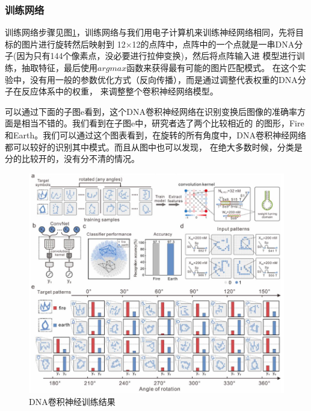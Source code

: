 \documentclass[a4paper,twoside]{article}
\begin{document}
\subsubsection{训练网络}
训练网络步骤见图\ref{dna-cnn-train}，训练网络与我们用电子计算机来训练神经网络相同，先将目标的图片进行旋转然后映射到
12$\times$12的点阵中，点阵中的一个点就是一串DNA分子(因为只有144个像素点，没必要进行拉伸变换)，然后将点阵输入进
模型进行训练，抽取特征，最后使用$argmax$函数来获得最有可能的图片匹配模式。
在这个实验中，没有用一般的参数优化方式（反向传播），而是通过调整代表权重的DNA分子在反应体系中的权重，
来调整整个卷积神经网络模型。

可以通过下面的子图e看到，这个DNA卷积神经网络在识别变换后图像的准确率方面是相当不错的。我们看到在子图e中，研究者选了两个比较相近的
的图形，Fire和Earth。我们可以通过这个图表看到，在旋转的所有角度中，DNA卷积神经网络都可以较好的识别其中模式。而且从图中也可以发现，
在绝大多数时候，分类是分的比较开的，没有分不清的情况。
\begin{figure}[htbp]
	\centering
	\includegraphics[width=0.8\linewidth]{images/dna-cnn-train.png}
	\caption{DNA卷积神经训练结果}
	\label{dna-cnn-train}
\end{figure}
\end{document}
